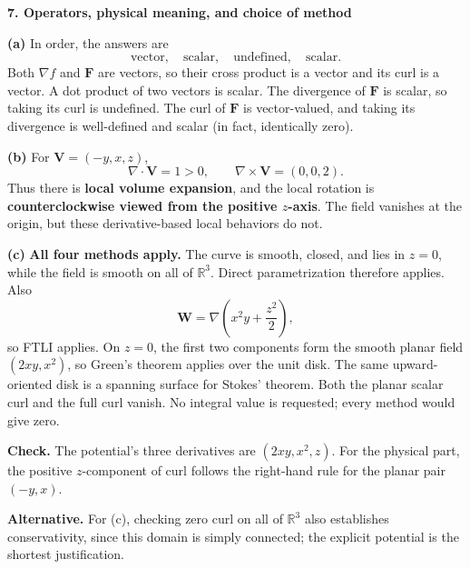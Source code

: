 \documentclass[11pt,letterpaper]{article}
\newcommand{\curl}{\nabla\times}
\newcommand{\dv}{\nabla\cdot}
\renewcommand{\vec}[1]{\mathbf{#1}}
\newcommand{\grad}{\nabla}
\newcommand{\solutionproblem}[3]{%
  \par\bigskip\Needspace{7\baselineskip}
  \noindent\textbf{#1. #2}\par\nobreak
}
\newcommand{\verification}[1]{\par\textbf{Check.} #1\par}
\newcommand{\alternative}[1]{\par\textbf{Alternative.} #1\par}
\begin{document}
\solutionproblem{7}{Operators, physical meaning, and choice of method}{14}
\textbf{(a)} In order, the answers are
\[
\boxed{\text{vector},\quad\text{scalar},\quad\text{undefined},\quad\text{scalar}}.
\]
Both $\grad f$ and $\vec F$ are vectors, so their cross product is a
vector and its curl is a vector. A dot product of two vectors is scalar.
The divergence of $\vec F$ is scalar, so taking its curl is undefined.
The curl of $\vec F$ is vector-valued, and taking its divergence is
well-defined and scalar (in fact, identically zero).

\textbf{(b)} For $\vec V=(-y,x,z)$,
\[
\dv\vec V=1>0,\qquad\curl\vec V=(0,0,2).
\]
Thus there is \textbf{local volume expansion}, and the local rotation is
\textbf{counterclockwise viewed from the positive $z$-axis}. The field
vanishes at the origin, but these derivative-based local behaviors do not.

\textbf{(c)} \textbf{All four methods apply.} The curve is smooth, closed,
and lies in $z=0$, while the field is smooth on all of $\mathbb R^3$.
Direct parametrization therefore applies. Also
\[
\vec W=\grad\left(x^2y+\frac{z^2}{2}\right),
\]
so FTLI applies. On $z=0$, the first two components form the smooth
planar field $(2xy,x^2)$, so Green's theorem applies over the unit disk.
The same upward-oriented disk is a spanning surface for Stokes' theorem.
Both the planar scalar curl and the full curl vanish. No integral value
is requested; every method would give zero.
\verification{The potential's three derivatives are $(2xy,x^2,z)$.
For the physical part, the positive $z$-component of curl follows the
right-hand rule for the planar pair $(-y,x)$.}
\alternative{For (c), checking zero curl on all of $\mathbb R^3$ also
establishes conservativity, since this domain is simply connected; the
explicit potential is the shortest justification.}
\end{document}
